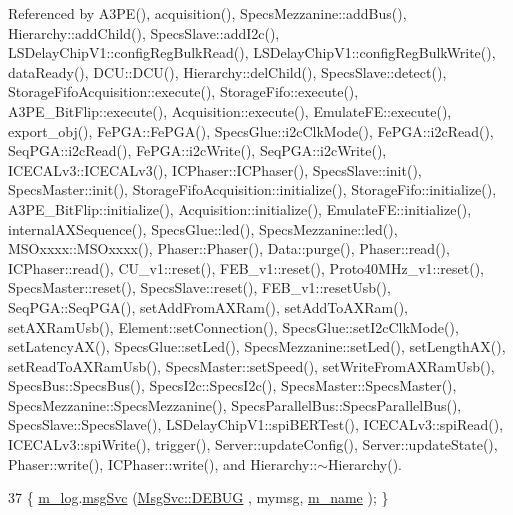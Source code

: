 Referenced by A3\+P\+E(), acquisition(), Specs\+Mezzanine\+::add\+Bus(), Hierarchy\+::add\+Child(), Specs\+Slave\+::add\+I2c(), L\+S\+Delay\+Chip\+V1\+::config\+Reg\+Bulk\+Read(), L\+S\+Delay\+Chip\+V1\+::config\+Reg\+Bulk\+Write(), data\+Ready(), D\+C\+U\+::\+D\+C\+U(), Hierarchy\+::del\+Child(), Specs\+Slave\+::detect(), Storage\+Fifo\+Acquisition\+::execute(), Storage\+Fifo\+::execute(), A3\+P\+E\+\_\+\+Bit\+Flip\+::execute(), Acquisition\+::execute(), Emulate\+F\+E\+::execute(), export\+\_\+obj(), Fe\+P\+G\+A\+::\+Fe\+P\+G\+A(), Specs\+Glue\+::i2c\+Clk\+Mode(), Fe\+P\+G\+A\+::i2c\+Read(), Seq\+P\+G\+A\+::i2c\+Read(), Fe\+P\+G\+A\+::i2c\+Write(), Seq\+P\+G\+A\+::i2c\+Write(), I\+C\+E\+C\+A\+Lv3\+::\+I\+C\+E\+C\+A\+Lv3(), I\+C\+Phaser\+::\+I\+C\+Phaser(), Specs\+Slave\+::init(), Specs\+Master\+::init(), Storage\+Fifo\+Acquisition\+::initialize(), Storage\+Fifo\+::initialize(), A3\+P\+E\+\_\+\+Bit\+Flip\+::initialize(), Acquisition\+::initialize(), Emulate\+F\+E\+::initialize(), internal\+A\+X\+Sequence(), Specs\+Glue\+::led(), Specs\+Mezzanine\+::led(), M\+S\+Oxxxx\+::\+M\+S\+Oxxxx(), Phaser\+::\+Phaser(), Data\+::purge(), Phaser\+::read(), I\+C\+Phaser\+::read(), C\+U\+\_\+v1\+::reset(), F\+E\+B\+\_\+v1\+::reset(), Proto40\+M\+Hz\+\_\+v1\+::reset(), Specs\+Master\+::reset(), Specs\+Slave\+::reset(), F\+E\+B\+\_\+v1\+::reset\+Usb(), Seq\+P\+G\+A\+::\+Seq\+P\+G\+A(), set\+Add\+From\+A\+X\+Ram(), set\+Add\+To\+A\+X\+Ram(), set\+A\+X\+Ram\+Usb(), Element\+::set\+Connection(), Specs\+Glue\+::set\+I2c\+Clk\+Mode(), set\+Latency\+A\+X(), Specs\+Glue\+::set\+Led(), Specs\+Mezzanine\+::set\+Led(), set\+Length\+A\+X(), set\+Read\+To\+A\+X\+Ram\+Usb(), Specs\+Master\+::set\+Speed(), set\+Write\+From\+A\+X\+Ram\+Usb(), Specs\+Bus\+::\+Specs\+Bus(), Specs\+I2c\+::\+Specs\+I2c(), Specs\+Master\+::\+Specs\+Master(), Specs\+Mezzanine\+::\+Specs\+Mezzanine(), Specs\+Parallel\+Bus\+::\+Specs\+Parallel\+Bus(), Specs\+Slave\+::\+Specs\+Slave(), L\+S\+Delay\+Chip\+V1\+::spi\+B\+E\+R\+Test(), I\+C\+E\+C\+A\+Lv3\+::spi\+Read(), I\+C\+E\+C\+A\+Lv3\+::spi\+Write(), trigger(), Server\+::update\+Config(), Server\+::update\+State(), Phaser\+::write(), I\+C\+Phaser\+::write(), and Hierarchy\+::$\sim$\+Hierarchy().


\begin{DoxyCode}
37 \{ \hyperlink{classObject_a0d269813dd7ac1f24bc143031e2963f2}{m\_log}.\hyperlink{classMsgSvc_ad25f18047920cc59a314e5098259711c}{msgSvc} (\hyperlink{classMsgSvc_ae671eb7301996cd049d2da8a65925926a1dbdcc82dce88370ec335883c83b38b0}{MsgSvc::DEBUG}   , mymsg, \hyperlink{classObject_a8b83c95c705d2c3ba0d081fe1710f48d}{m\_name} ); \}
\end{DoxyCode}
\mbox{\label{classObject_a6c9a0397ca804e04d675ed05683f5420}} 
